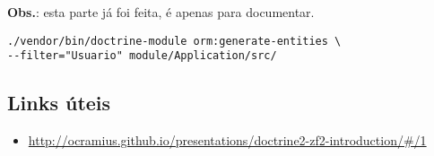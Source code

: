 \textbf{Obs.}: esta parte já foi feita, é apenas para documentar.

\begin{verbatim}
./vendor/bin/doctrine-module orm:generate-entities \
--filter="Usuario" module/Application/src/
\end{verbatim}
\subsection{Links úteis}

\begin{itemize}
\item
  \url{http://ocramius.github.io/presentations/doctrine2-zf2-introduction/#/1}
\end{itemize}
